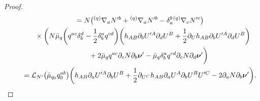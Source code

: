 \documentclass[11pt]{article}
\numberwithin{equation}{section}
\def\ptl{\partial}%
\def\mbo#1{\boldsymbol{#1}}%
\def\grad{{\nabla}}%
\newcommand{\leftexp}[2]{{\vphantom{#2}}^{#1}{#2}}
\def\halb{\frac{1}{2}}%
\numberwithin{equation}{section}
\begin{document}
\begin{proof}
\begin{gather*}
 \qquad{} = N \bigl(\leftexp{(q)}{\grad}_a N'^b + \leftexp{(q)}{\grad}_a N'^b - \delta^b_a \leftexp{(q)}{\grad}_c N'^c\bigr) \\
\qquad\quad{}\times\biggl( N \bar{\mu}_q \biggl(q^{ac} \delta^d_b - \halb \delta^a_b q^{cd}\biggr) \biggl(h_{AB} \ptl_b U'^A \ptl_d U^B + \halb \ptl_{U}h_{AB} \ptl_b U'^A \ptl_d U^B \biggr) \\
\qquad\quad\hphantom{\times\biggl(\,}{} + 2 \bar{\mu}_q q^{ac}\ptl_c N \ptl_b \mbo{\nu}'
 - \bar{\mu}_q \delta^a_b q^{cd} \ptl_c N \ptl_d \mbo{\nu}'\biggr) \\
\qquad{} = \mathcal{L}_{N'} \bigl(\bar{\mu}_{q_0} q^{ab}_0\bigr) \biggl(h_{AB} \ptl_a U'^A \ptl_b U^B + \halb \ptl_{U^C} h_{AB} \ptl_a U^A \ptl_b U^B U'^C -2 \ptl_a N \ptl_b \mbo{\nu}'\biggr).
\end{gather*}


\end{proof}
\end{document}
